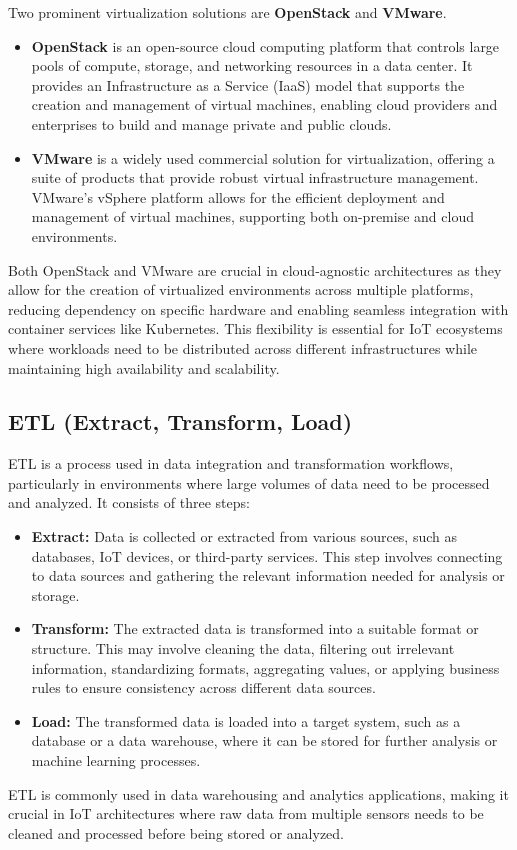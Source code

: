 Two prominent virtualization solutions are \textbf{OpenStack}\cite{site:openstack} and \textbf{VMware}\cite{site:vmware}.

\begin{itemize}
    \item \textbf{OpenStack} is an open-source cloud computing platform that controls large pools of compute, storage, and networking resources in a data center. It provides an Infrastructure as a Service (IaaS) model that supports the creation and management of virtual machines, enabling cloud providers and enterprises to build and manage private and public clouds.
    \item \textbf{VMware} is a widely used commercial solution for virtualization, offering a suite of products that provide robust virtual infrastructure management. VMware’s vSphere platform allows for the efficient deployment and management of virtual machines, supporting both on-premise and cloud environments.
\end{itemize}

Both OpenStack and VMware are crucial in cloud-agnostic architectures as they allow for the creation of virtualized environments across multiple platforms, reducing dependency on specific hardware and enabling seamless integration with container services like Kubernetes. This flexibility is essential for IoT ecosystems where workloads need to be distributed across different infrastructures while maintaining high availability and scalability.


\subsection*{ETL (Extract, Transform, Load)}
\label{sec:etl}
ETL is a process used in data integration and transformation workflows, particularly in environments where large volumes of data need to be processed and analyzed. It consists of three steps:
\begin{itemize}
    \item \textbf{Extract:} Data is collected or extracted from various sources, such as databases, IoT devices, or third-party services. This step involves connecting to data sources and gathering the relevant information needed for analysis or storage.
    \item \textbf{Transform:} The extracted data is transformed into a suitable format or structure. This may involve cleaning the data, filtering out irrelevant information, standardizing formats, aggregating values, or applying business rules to ensure consistency across different data sources.
    \item \textbf{Load:} The transformed data is loaded into a target system, such as a database or a data warehouse, where it can be stored for further analysis or machine learning processes.
\end{itemize}
ETL is commonly used in data warehousing and analytics applications, making it crucial in IoT architectures where raw data from multiple sensors needs to be cleaned and processed before being stored or analyzed. 



